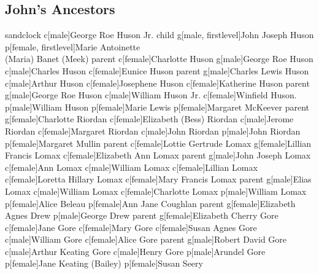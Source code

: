 \documentclass{article}
\begin{document}
\subsection*{John's Ancestors}
  \vspace{2cm}
\begin{genealogypicture}[
  template=signpost, 
  node size=1.5cm, level distance=1.5cm,
  ]
  sandclock{
    c[male]{George Roe Huson Jr.}
    child{
      g[male, firstlevel]{John Joseph Huson}
      p[female, firstlevel]{Marie Antoinette \\(Maria) Banet (Meek)}
      }
      parent{
        c[female]{Charlotte Huson}
        g[male]{George Roe Huson}
        c[male]{Charles Huson}
        c[female]{Eunice Huson}
        parent{
          g[male]{Charles Lewis Huson}
          c[male]{Arthur Huson}
          c[female]{Josephene Huson}
          c[female]{Katherine Huson}
          parent{
            g[male]{George Roe Huson}
            c[male]{William Huson Jr.}
            c[female]{Winfield Huson.}
            p[male]{William Huson}
            p[female]{Marie Lewis}
            }
          p[female]{Margaret McKeever}
          }
        parent{
          g[female]{Charlotte Riordan}
          c[female]{Elizabeth (Bess) Riordan}
          c[male]{Jerome Riordan}
          c[female]{Margaret Riordan}
          c[male]{John Riordan}
          p[male]{John Riordan}
          p[female]{Margaret Mullin}
          }
        }
        parent{
          c[female]{Lottie Gertrude Lomax}
          g[female]{Lillian Francis Lomax}
          c[female]{Elizabeth Ann Lomax}
          parent
            {
            g[male]{John Joseph Lomax}
            c[female]{Ann Lomax}
            c[male]{William Lomax}
            c[female]{Lillian Lomax}
            c[female]{Loretta Hillary Lomax}
            c[female]{Mary Francis Lomax}
            parent{
              g[male]{Elias Lomax}
              c[male]{William Lomax}
              c[female]{Charlotte Lomax}
              p[male]{William Lomax}
              p[female]{Alice Beleau}
              }
            p[female]{Ann Jane Coughlan}
            }
          parent{
            g[female]{Elizabeth Agnes Drew}
            p[male]{George Drew}
            parent{
              g[female]{Elizabeth Cherry Gore}
              c[female]{Jane Gore}
              c[female]{Mary Gore}
              c[female]{Susan Agnes Gore}
              c[male]{William Gore}
              c[female]{Alice Gore}
              parent{
                g[male]{Robert David Gore}
                c[male]{Arthur Keating Gore}
                c[male]{Henry Gore}
                p[male]{Arundel Gore}
                p[female]{Jane Keating (Bailey)}
                }
              p[female]{Susan Seery}
              }
            }
          }
  }
\end{genealogypicture}
\end{document}

